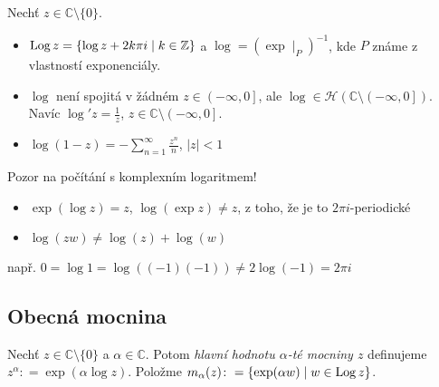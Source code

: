 \begin{properties}
Nechť $z \in\mathbb{C}\setminus\{0\}$.

\begin{itemize}
    \item $\operatorname*{Log} z =\{\log z +2k\pi i\mid k\in\mathbb{Z}\}$ a $
    \log =(\exp{}\mid _P)^{-1}$, kde $P$ známe z vlastností exponenciály.
    \item $\log{}$ není spojitá v žádném $z\in\left (-\infty,0\right ]$, ale $\log{}\in \mathcal{H}(\mathbb{C}\setminus\left (-\infty,0\right ])$.
    \newline Navíc $\log'z=\frac{1}{z}$, $z\in\mathbb{C}\setminus\left (-\infty,0\right ]$.
     \item $\log(1-z)=-\sum_{n=1}^{\infty}\frac{z^n}{n}$, $\lvert z \rvert<1$
\end{itemize}

 Pozor na počítání s komplexním logaritmem! %

 \begin{itemize}
     \item $\exp(\log z)=z$, $\log(\exp{z})\neq z$, z toho, že je to $2\pi i$-periodické
     \item $\log(z w)\neq \log(z) + \log(w)$
 \end{itemize}
\end{properties}


např. $0=\log 1= \log((-1)(-1))\neq 2 \log(-1)=2\pi i$

\subsection{Obecná mocnina}

\begin{definition}
Nechť $z \in\mathbb{C}\setminus\{0\}$ a  $\alpha\in\mathbb{C}$. Potom \emph{hlavní hodnotu $\alpha$-té mocniny $z$} definujeme $z^{\alpha}\colon=\exp(\alpha \log z)$. Položme $m_{\alpha}(z)\colon=\{\exp(\alpha w)\mid w\in \operatorname*{Log} z\}$. %
\end{definition}

